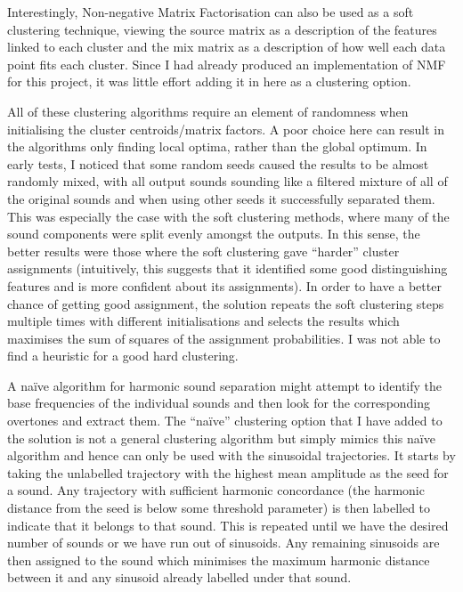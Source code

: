 \documentclass[10pt,twoside,a4paper]{report}
\begin{document}
Interestingly, Non-negative Matrix Factorisation can also be used as a soft clustering technique, viewing the source matrix as a description of the features linked to each cluster and the mix matrix as a description of how well each data point fits each cluster. Since I had already produced an implementation of NMF for this project, it was little effort adding it in here as a clustering option.

All of these clustering algorithms require an element of randomness when initialising the cluster centroids/matrix factors. A poor choice here can result in the algorithms only finding local optima, rather than the global optimum. In early tests, I noticed that some random seeds caused the results to be almost randomly mixed, with all output sounds sounding like a filtered mixture of all of the original sounds and when using other seeds it successfully separated them. This was especially the case with the soft clustering methods, where many of the sound components were split evenly amongst the outputs. In this sense, the better results were those where the soft clustering gave ``harder'' cluster assignments (intuitively, this suggests that it identified some good distinguishing features and is more confident about its assignments). In order to have a better chance of getting good assignment, the solution repeats the soft clustering steps multiple times with different initialisations and selects the results which maximises the sum of squares of the assignment probabilities. I was not able to find a heuristic for a good hard clustering.

A na\"{i}ve algorithm for harmonic sound separation might attempt to identify the base frequencies of the individual sounds and then look for the corresponding overtones and extract them. The ``na\"{i}ve'' clustering option that I have added to the solution is not a general clustering algorithm but simply mimics this na\"{i}ve algorithm and hence can only be used with the sinusoidal trajectories. It starts by taking the unlabelled trajectory with the highest mean amplitude as the seed for a sound. Any trajectory with sufficient harmonic concordance (the harmonic distance from the seed is below some threshold parameter) is then labelled to indicate that it belongs to that sound. This is repeated until we have the desired number of sounds or we have run out of sinusoids. Any remaining sinusoids are then assigned to the sound which minimises the maximum harmonic distance between it and any sinusoid already labelled under that sound.
\end{document}
